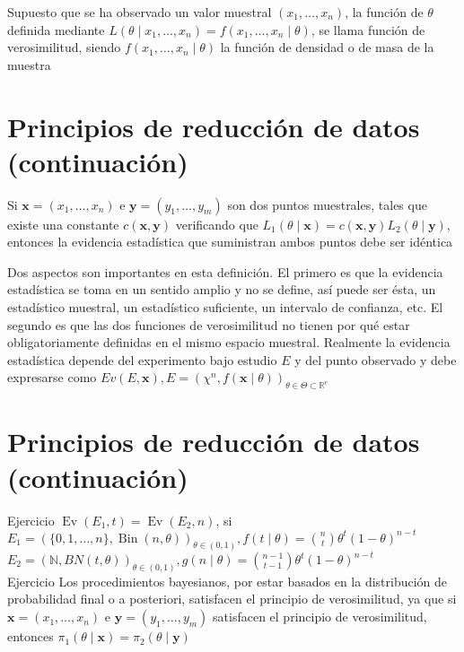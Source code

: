 Supuesto que se ha observado un valor muestral $\left(x_{1}, \ldots, x_{n}\right)$, la función de $\theta$ definida mediante $L\left(\theta \mid x_{1}, \ldots, x_{n}\right)=f\left(x_{1}, \ldots, x_{n} \mid \theta\right)$, se llama función de verosimilitud, siendo $f\left(x_{1}, \ldots, x_{n} \mid \theta\right)$ la función de densidad o de masa de la muestra

\section*{Principios de reducción de datos (continuación)}
Si $\mathbf{x}=\left(x_{1}, \ldots, x_{n}\right)$ e $\mathbf{y}=\left(y_{1}, \ldots, y_{m}\right)$ son dos puntos muestrales, tales que existe una constante $c(\mathbf{x}, \mathbf{y})$ verificando que $L_{1}(\theta \mid \mathbf{x})=c(\mathbf{x}, \mathbf{y}) L_{2}(\theta \mid \mathbf{y})$, entonces la evidencia estadística que suministran ambos puntos debe ser idéntica

Dos aspectos son importantes en esta definición. El primero es que la evidencia estadística se toma en un sentido amplio y no se define, así puede ser ésta, un estadístico muestral, un estadístico suficiente, un intervalo de confianza, etc. El segundo es que las dos funciones de verosimilitud no tienen por qué estar obligatoriamente definidas en el mismo espacio muestral. Realmente la evidencia estadística depende del experimento bajo estudio $E$ y del punto observado y debe expresarse como $E v(E, \mathbf{x}), E=\left(\chi^{n}, f(\mathbf{x} \mid \theta)\right)_{\theta \in \Theta \subset \mathbb{R}^{e}}$

\section*{Principios de reducción de datos (continuación)}
Ejercicio $\operatorname{Ev}\left(E_{1}, t\right)=\operatorname{Ev}\left(E_{2}, n\right)$, si\\
$E_{1}=(\{0,1, \ldots, n\}, \operatorname{Bin}(n, \theta))_{\theta \in(0,1)}, f(t \mid \theta)=\binom{n}{t} \theta^{t}(1-\theta)^{n-t}$\\
$E_{2}=(\mathbb{N}, B N(t, \theta))_{\theta \in(0,1)}, g(n \mid \theta)=\binom{n-1}{t-1} \theta^{t}(1-\theta)^{n-t}$\\
Ejercicio Los procedimientos bayesianos, por estar basados en la distribución de probabilidad final o a posteriori, satisfacen el principio de verosimilitud, ya que si $\mathbf{x}=\left(x_{1}, \ldots, x_{n}\right)$ e $\mathbf{y}=\left(y_{1}, \ldots, y_{m}\right)$ satisfacen el principio de verosimilitud, entonces $\pi_{1}(\theta \mid \mathbf{x})=\pi_{2}(\theta \mid \mathbf{y})$

